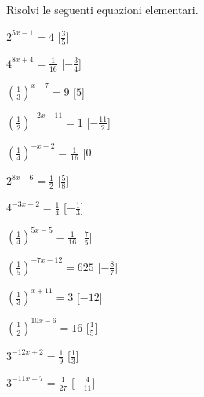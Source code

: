 \begin{esercizio}\label{ese:}
 Risolvi le seguenti equazioni elementari.
\begin{multicols}{2}
 \begin{enumeratea}
  \item  \(2^{5 x -1} = 4\)
   \hfill [\(\frac{3}{5}\)]
  \item  \(4^{8 x +4} = \frac{1}{16}\)
   \hfill [\(-\frac{3}{4}\)]
  \item  \(\left(\frac{1}{3}\right)^{x -7} = 9\)
   \hfill [\(5\)]
  \item  \(\left(\frac{1}{2}\right)^{-2 x -11} = 1\)
   \hfill [\(-\frac{11}{2}\)]
  \item  \(\left(\frac{1}{4}\right)^{- x +2} = \frac{1}{16}\)
   \hfill [\(0\)]
  \item  \(2^{8 x -6} = \frac{1}{2}\)
   \hfill [\(\frac{5}{8}\)]
  \item  \(4^{-3 x -2} = \frac{1}{4}\)
   \hfill [\(-\frac{1}{3}\)]
  \item  \(\left(\frac{1}{4}\right)^{5 x -5} = \frac{1}{16}\)
   \hfill [\(\frac{7}{5}\)]
  \item  \(\left(\frac{1}{5}\right)^{-7 x -12} = 625\)
   \hfill [\(-\frac{8}{7}\)]
  \item  \(\left(\frac{1}{3}\right)^{x +11} = 3\)
   \hfill [\(-12\)]
  \item  \(\left(\frac{1}{2}\right)^{10 x -6} = 16\)
   \hfill [\(\frac{1}{5}\)]
  \item  \(3^{-12 x +2} = \frac{1}{9}\)
   \hfill [\(\frac{1}{3}\)]
  \item  \(3^{-11 x -7} = \frac{1}{27}\)
   \hfill [\(-\frac{4}{11}\)]   
 \end{enumeratea}
 \end{multicols}
\end{esercizio}


